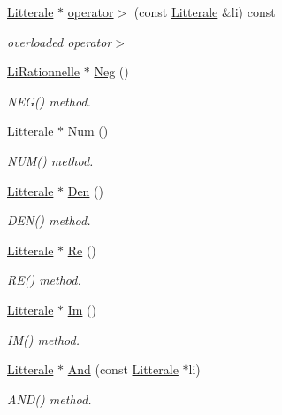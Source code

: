 \begin{DoxyCompactItemize}
\hyperlink{class_litterale}{Litterale} $\ast$ \hyperlink{class_li_rationnelle_ae3be0f9aa5b254c43b198b658366d526}{operator$>$} (const \hyperlink{class_litterale}{Litterale} \&li) const 
\begin{DoxyCompactList}\small\item\em overloaded operator$>$ \end{DoxyCompactList}\item 
\hyperlink{class_li_rationnelle}{Li\+Rationnelle} $\ast$ \hyperlink{class_li_rationnelle_a102af5b1669d85ba3bc0f93286e5f75f}{Neg} ()
\begin{DoxyCompactList}\small\item\em N\+E\+G() method. \end{DoxyCompactList}\item 
\hyperlink{class_litterale}{Litterale} $\ast$ \hyperlink{class_li_rationnelle_a1a7a534097e249eccff3fd8a0f37c722}{Num} ()
\begin{DoxyCompactList}\small\item\em N\+U\+M() method. \end{DoxyCompactList}\item 
\hyperlink{class_litterale}{Litterale} $\ast$ \hyperlink{class_li_rationnelle_afaa05daee860500829bb2f8bb0d3458f}{Den} ()
\begin{DoxyCompactList}\small\item\em D\+E\+N() method. \end{DoxyCompactList}\item 
\hyperlink{class_litterale}{Litterale} $\ast$ \hyperlink{class_li_rationnelle_aa1eb24b28a4df2145a315bdd71455754}{Re} ()
\begin{DoxyCompactList}\small\item\em R\+E() method. \end{DoxyCompactList}\item 
\hyperlink{class_litterale}{Litterale} $\ast$ \hyperlink{class_li_rationnelle_aba3efd619ca23e4dfb3e9b79f34eb438}{Im} ()
\begin{DoxyCompactList}\small\item\em I\+M() method. \end{DoxyCompactList}\item 
\hyperlink{class_litterale}{Litterale} $\ast$ \hyperlink{class_li_rationnelle_adf47ed34fdf8cb4226064ac9599446ac}{And} (const \hyperlink{class_litterale}{Litterale} $\ast$li)
\begin{DoxyCompactList}\small\item\em A\+N\+D() method. \end{DoxyCompactList}\item 

\end{DoxyCompactItemize}
